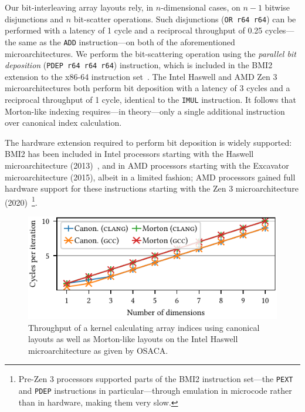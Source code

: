 Our bit-interleaving array layouts rely, in $n$-dimensional cases, on $n-1$ bitwise disjunctions and $n$ bit-scatter operations. Such disjunctions (\texttt{OR r64 r64}) can be performed with a latency of 1 cycle and a reciprocal throughput of 0.25 cycles---the same as the \texttt{ADD} instruction---on both of the aforementioned microarchitectures. We perform the bit-scattering operation using the \emph{parallel bit deposition} (\texttt{PDEP r64 r64 r64}) instruction, which is included in the BMI2 extension to the x86-64 instruction set~\cite{10.1145/3319647.3325833}. The Intel Haswell and AMD Zen 3 microarchitectures both perform bit deposition with a latency of 3 cycles and a reciprocal throughput of 1 cycle, identical to the \texttt{IMUL} instruction. It follows that Morton-like indexing requires---in theory---only a single additional instruction over canonical index calculation.

The hardware extension required to perform bit deposition is widely supported: BMI2 has been included in Intel processors starting with the Haswell microarchitecture (2013)~\cite{6762795}, and in AMD processors starting with the Excavator microarchitecture (2015), albeit in a limited fashion; AMD processors gained full hardware support for these instructions starting with the Zen 3 microarchitecture (2020)~\cite{9718180}\footnote{Pre-Zen 3 processors supported parts of the BMI2 instruction set---the \texttt{PEXT} and \texttt{PDEP} instructions in particular---through emulation in microcode rather than in hardware, making them very slow.}. 

\begin{figure}
    \centering
    \includegraphics{figures/canon_vs_morton_cycles.pdf}
    \caption{Throughput of a kernel calculating array indices using canonical layouts as well as Morton-like layouts on the Intel Haswell microarchitecture as given by \textsc{OSACA}.}
    \label{fig:canon_vs_morton}
\end{figure}

